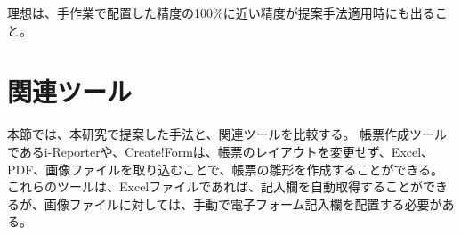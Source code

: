 






理想は、手作業で配置した精度の100\%に近い精度が提案手法適用時にも出ること。



\section{関連ツール}\label{sec:relation_tools}
本節では、本研究で提案した手法と、関連ツールを比較する。
帳票作成ツールであるi-Reporter\cite{i-Reporter}や、Create!Form\cite{Create!Form}は、帳票のレイアウトを変更せず、Excel、PDF、画像ファイルを取り込むことで、帳票の雛形を作成することができる。
これらのツールは、Excelファイルであれば、記入欄を自動取得することができるが、画像ファイルに対しては、手動で電子フォーム記入欄を配置する必要がある。




